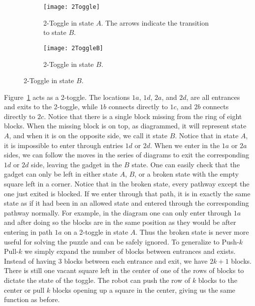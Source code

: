 \begin{figure}[!ht]
\centering
\begin{subfigure}[t]{0.45\textwidth}
  \centering
    \texttt{[image: 2Toggle]}
    \caption{2-Toggle in state $A$. The arrows indicate the transition to state $B$.}
    \label{fig:2toggleA}
\end{subfigure}
\begin{subfigure}[t]{0.45\textwidth}
  \centering
    \texttt{[image: 2ToggleB]}
    \caption{2-Toggle in state $B$.}
    \label{fig:2toggleB}
\end{subfigure}
\end{figure}

Figure~\ref{fig:2toggleA} acts as a 2-toggle. The locations $1a$, $1d$, $2a$, and $2d$, are all entrances and exits to the 2-toggle, while $1b$ connects directly to $1c$, and $2b$ connects directly to $2c$. Notice that there is a single block missing from the ring of eight blocks. When the missing block is on top, as diagrammed, it will represent state $A$, and when it is on the opposite side, we call it state $B$. Notice that in state $A$, it is impossible to enter through entries $1d$ or $2d$. When we enter in the $1a$ or $2a$ sides, we can follow the moves in the series of diagrams to exit the corresponding $1d$ or $2d$ side, leaving the gadget in the $B$ state. One can easily check that the gadget can only be left in either state $A$, $B$, or a broken state with the empty square left in a corner. Notice that in the broken state, every pathway except the one just exited is blocked. If we enter through that path, it is in exactly the same state as if it had been in an allowed state and entered through the corresponding pathway normally. For example, in the diagram one can only enter through $1a$ and after doing so the blocks are in the same position as they would be after entering in path $1a$ on a 2-toggle in state $A$. Thus the broken state is never more useful for solving the puzzle and can be safely ignored. To generalize to Push-$k$ Pull-$k$ we simply expand the number of blocks between entrances and exists. Instead of having $3$ blocks between each entrance and exit, we have $2k+1$ blocks. There is still one vacant square left in the center of one of the rows of blocks to dictate the state of the toggle. The robot can push the row of $k$ blocks to the center or pull $k$ blocks opening up a square in the center, giving us the same function as before.

